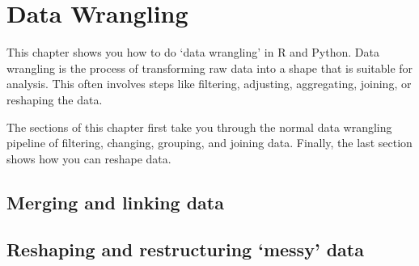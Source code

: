 \chapter{Data Wrangling}
\label{chap:datawrangling}
This chapter shows you how to do `data wrangling' in R and Python.
Data wrangling is the process of transforming raw data into a shape that is suitable for analysis.
This often involves steps like filtering, adjusting, aggregating, joining, or reshaping the data.

The sections of this chapter first take you through the normal data wrangling pipeline of
filtering, changing, grouping, and joining data. Finally, the last section shows how you can
reshape data.










\section{Merging and linking  data}
\section{Reshaping and restructuring ‘messy’ data}
